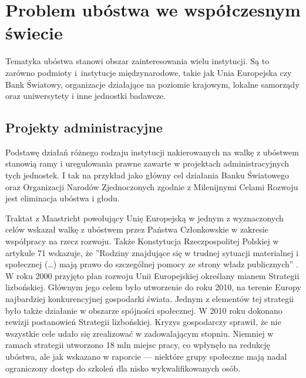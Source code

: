 
\section{Problem ubóstwa we współczesnym świecie}\label{problem-ubostwa-we-wspoczesnym-swiecie}

Tematyka ubóstwa stanowi obszar zainteresowania wielu instytucji. Są to zarówno podmioty i~instytucje międzynarodowe, takie jak Unia Europejska czy Bank Światowy, organizacje działające na poziomie krajowym, lokalne samorządy oraz uniwersytety i inne jednostki badawcze.

\subsection{Projekty administracyjne}\label{projekty-administracyjne}

Podstawę  działań różnego rodzaju instytucji nakierowanych na walkę z ubóstwem stanowią ramy i uregulowania  prawne zawarte w projektach administracyjnych tych jednostek. I tak na przykład jako główny cel działania Banku Światowego oraz Organizacji Narodów Zjednoczonych zgodnie z Milenijnymi Celami Rozwoju jest eliminacja ubóstwa i głodu.

Traktat z Maastricht powołujący Unię Europejską w jednym z wyznaczonych celów wskazał walkę z ubóstwem przez Państwa Członkowskie w zakresie współpracy na rzecz rozwoju. Także Konstytucja Rzeczpospolitej Polskiej w artykule 71 wskazuje, że ''Rodziny znajdujące się w trudnej sytuacji materialnej i społecznej (\ldots{}) mają prawo do szczególnej pomocy ze strony władz publicznych'' \citep{konstyt1997}. W roku 2000 przyjęto plan rozwoju Unii Europejskiej określany mianem Strategii lizbońskiej. Głównym jego celem było utworzenie do roku 2010, na terenie Europy najbardziej konkurencyjnej gospodarki świata. Jednym z elementów tej strategii było także działanie w obszarze spójności społecznej. W 2010 roku dokonano rewizji postanowień Strategii lizbońskiej. Kryzys gospodarczy sprawił, że nie wszystkie cele udało się zrealizować w zadowalającym stopniu. Niemniej w ramach strategii utworzono 18 mln miejsc pracy, co wpłynęło na redukcję ubóstwa, ale jak wskazano w raporcie --- niektóre grupy społeczne mają nadal ograniczony dostęp do szkoleń dla nisko wykwalifikowanych osób.

